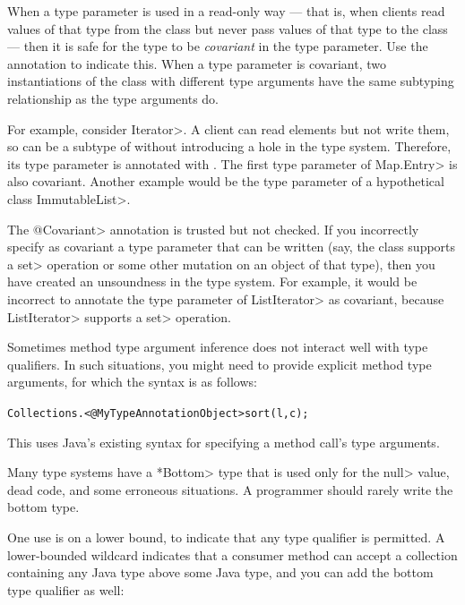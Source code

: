 When a type parameter is used in a read-only way --- that is, when clients
read values of that type from the class but never pass values of that type
to the class --- then it is safe for the
type to be \emph{covariant} in the type parameter.  Use the
 annotation to indicate this.
When a type parameter is covariant, two instantiations of the class with
different type arguments have the same subtyping relationship as the type
arguments do.

For example, consider \<Iterator>.  A client can read elements but not
write them, so  can be a subtype of
 without introducing a hole in the type system.
Therefore, its type parameter is annotated with
.
The first type parameter of \<Map.Entry> is also covariant.
Another example would be the type parameter of a hypothetical class
\<ImmutableList>.

The \<@Covariant> annotation is trusted but not checked.
If you incorrectly specify as covariant a type parameter that can be
written (say, the class supports a
\<set> operation or some other mutation on an object of that type), then
you have created an unsoundness in the type system.
For example, it would be incorrect to annotate the type parameter of
\<ListIterator> as covariant, because \<ListIterator> supports a \<set>
operation.



Sometimes method type argument inference does not interact well with
type qualifiers. In such situations, you might need to provide
explicit method type arguments, for which the syntax is as follows:

\begin{alltt}
    Collections.<@MyTypeAnnotation Object>sort(l, c);
\end{alltt}

\noindent
This uses Java's existing syntax for specifying a method call's type arguments.



Many type systems have a \<*Bottom> type that is used only for the \<null>
value, dead code, and some erroneous situations.  A programmer should
rarely write the bottom type.

One use is on a lower bound, to indicate that any type qualifier is
permitted.  A lower-bounded wildcard indicates that a consumer method can
accept a collection containing any Java type above some Java type, and you
can add the bottom type qualifier as well:

